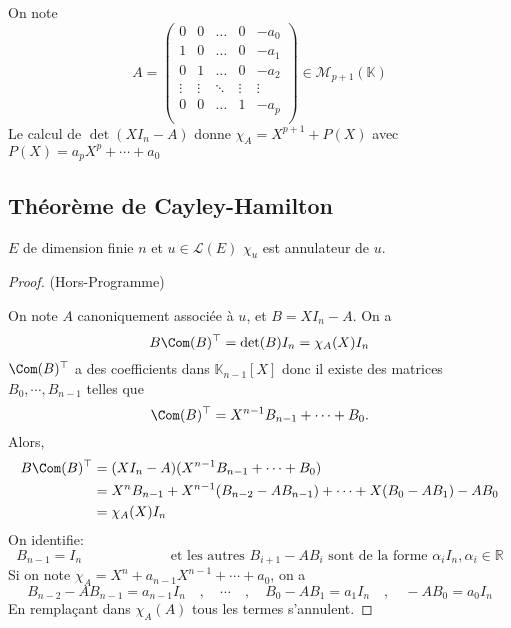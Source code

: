 \begin{ex} On note \[
    A= \begin{pmatrix}
0 & 0 & \dots & 0 & -a_0 \\
1 & 0 & \dots & 0 & -a_1 \\
0 & 1 & \dots & 0 & -a_2 \\
\vdots & \vdots & \ddots & \vdots & \vdots \\
0 & 0 & \dots & 1 & -a_{p} \\
\end{pmatrix}\in \mathcal M_{p+1}(\mathbb K)
\]
Le calcul de $\det(XI_n-A)$ donne $\chi_A=X^{p+1}+P(X)$ avec $P(X)=a_pX^p+\cdots +a_0$
\end{ex}

\subsection{Théorème de Cayley-Hamilton}

\begin{thm}
    \Hyp $E$ de dimension finie $n$ et $u\in\mathcal L(E)$
    \Conc $\chi_u$ est annulateur de $u$.
\end{thm}

\begin{proof} (Hors-Programme)

    On note $A$ canoniquement associée à $u$, et $B=XI_n-A$. On a \[
        B\Com(B)^\top = \det(B)I_n=\chi_A(X)I_n
    \]
    $\Com(B)^\top$ a des coefficients dans $\mathbb K_{n-1}[X]$ donc il existe des matrices $B_0, \cdots, B_{n-1}$ telles que \[
        \Com(B)^\top=X^{n-1}B_{n-1}+\cdots +B_0.
    \]
    Alors, \begin{align*}
        B\Com(B)^\top&=(XI_n-A)(X^{n-1}B_{n-1}+\cdots +B_0)\\
                     &=X^nB_{n-1}+X^{n-1}(B_{n-2}-AB_{n-1})+\cdots + X(B_0-AB_1)-AB_0\\
                     &=\chi_A(X)I_n
    \end{align*}
    On identifie: \[
        B_{n-1}=I_n\qquad \qquad \qquad \text{ et les autres }B_{i+1}-AB_i\text{ sont de la forme }\alpha_i I_n, \alpha_i\in\mathbb R
    \]
    Si on note $\chi_A=X^n+a_{n-1}X^{n-1}+\cdots +a_0$, on a \[
        B_{n-2}-AB_{n-1}=a_{n-1}I_n\quad , \quad \cdots \quad,\quad B_0-AB_1=a_1 I_n\quad,\quad  -AB_0=a_0I_n
    \]
    En remplaçant dans $\chi_A(A)$ tous les termes s'annulent.
\end{proof}

